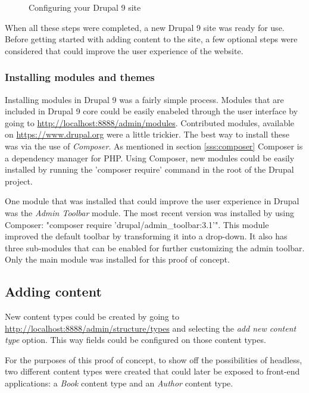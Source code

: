 \begin{enumerate}
\begin{figure}
		\caption[Configuring Drupal 9]{Configuring your Drupal 9 site}
	\end{figure}
\end{enumerate}

When all these steps were completed, a new Drupal 9 site was ready for use. Before getting started with adding content to the site, a few optional steps were considered that could improve the user experience of the website.

\subsubsection{Installing modules and themes}

Installing modules in Drupal 9 was a fairly simple process. Modules that are included in Drupal 9 core could be easily enabeled through the user interface by going to \url{http://localhost:8888/admin/modules}. Contributed modules, available on \url{https://www.drupal.org} were a little trickier. The best way to install these was via the use of \emph{Composer}. As mentioned in section \ref{sss:composer}  Composer is a dependency manager for PHP.  Using Composer, new modules could be easily installed by running the 'composer require' command in the root of the Drupal project.

One module that was installed that could improve the user experience in Drupal was the \emph{Admin Toolbar} module. The most recent version was installed by using Composer: "composer require 'drupal/admin\_toolbar:3.1'". This module improved the default toolbar by transforming it into a  drop-down. It also has three sub-modules that can be enabled for further customizing the admin toolbar. Only the main module was installed for this proof of concept.

\subsection{Adding content}

New content types could be created by going to \url{http://localhost:8888/admin/structure/types} and selecting the \emph{add new content type} option. This way fields could be configured on those content types.

For the purposes of this proof of concept, to show off the possibilities of headless, two different content types were created that could later be exposed to front-end applications: a \emph{Book} content type and an \emph{Author} content type.

